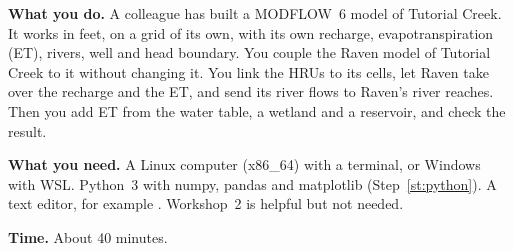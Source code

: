 \begin{goal}
\textbf{What you do.} A colleague has built a MODFLOW~6 model of Tutorial Creek. It works in feet, on a grid of its own,
with its own recharge, evapotranspiration (ET), rivers, well and head boundary. You couple the Raven model of Tutorial
Creek to it without changing it. You link the HRUs to its cells, let Raven take over the recharge and the ET, and send its
river flows to Raven's river reaches. Then you add ET from the water table, a wetland and a reservoir, and check the
result.

\textbf{What you need.} A Linux computer (x86\_64) with a terminal, or Windows with WSL. Python~3 with numpy, pandas and
matplotlib (Step~\ref{st:python}). A text editor, for example . Workshop~2 is helpful but not needed.

\textbf{Time.} About 40 minutes.
\end{goal}
